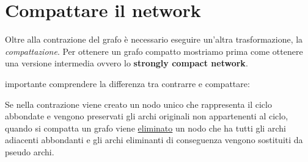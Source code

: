 \documentclass[a4paper, 11pt]{report}
\begin{document}
\section{Compattare il network}
Oltre alla contrazione del grafo è necessario eseguire un'altra trasformazione, la \textit{compattazione}.
Per ottenere un grafo compatto mostriamo prima come ottenere una versione intermedia ovvero lo \textbf{strongly compact network}.

 importante comprendere la differenza tra contrarre e compattare:

Se nella contrazione viene creato un nodo unico che rappresenta il ciclo abbondate e vengono preservati gli archi originali non appartenenti al ciclo, 
quando si compatta un grafo viene \underline{eliminato} un nodo che ha tutti gli archi adiacenti abbondanti e gli archi eliminanti di conseguenza vengono sostituiti da pseudo archi.
\end{document}
